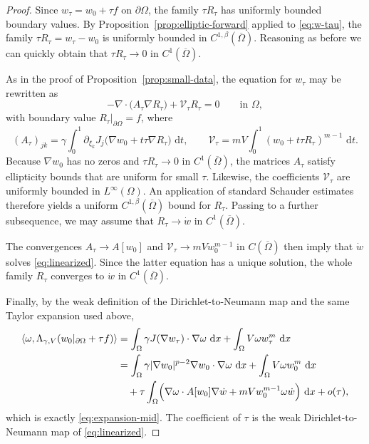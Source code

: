 \documentclass[a4paper,12pt]{article}
\newcommand{\la}{\langle}
\newcommand{\ra}{\rangle}
\newcommand{\pr}{\partial}
\newcommand{\dd}{\,\mathrm{d}}
\theoremstyle{definition}
\theoremstyle{remark}
\begin{document}
\begin{proof}
Since $w_\tau=w_0+\tau f$ on $\pr\Omega$, the family $\tau R_\tau$ has uniformly bounded boundary values. By Proposition~\ref{prop:elliptic-forward} applied to \eqref{eq:w-tau}, the family $\tau R_\tau=w_\tau-w_0$ is uniformly bounded in $C^{1,\beta}(\overline\Omega)$. Reasoning as before we can quickly obtain that $\tau R_\tau\to 0$ in $C^1(\overline\Omega)$.

As in the proof of Proposition~\ref{prop:small-data}, the equation for $w_\tau$ may be rewritten as
\[
-\nabla\cdot\bigl(A_\tau\nabla R_\tau\bigr)+\mathcal V_\tau R_\tau=0
\qquad\text{in }\Omega,
\]
with boundary value $R_\tau|_{\pr\Omega}=f$, where
\[
(A_\tau)_{jk}=\gamma\int_0^1 \partial_{\xi_k}J_j\bigl(\nabla w_0+t\tau\nabla R_\tau\bigr)\,\dd t,
\qquad
\mathcal V_\tau=mV\int_0^1 (w_0+t\tau R_\tau)^{m-1}\,\dd t.
\]
Because $\nabla w_0$ has no zeros and $\tau R_\tau\to 0$ in $C^1(\overline\Omega)$, the matrices $A_\tau$ satisfy ellipticity bounds that are uniform for small $\tau$. Likewise, the coefficients $\mathcal V_\tau$ are uniformly bounded in $L^\infty(\Omega)$. An  application of standard Schauder estimates therefore yields a uniform $C^{1,\beta}(\overline\Omega)$ bound for $R_\tau$. Passing to a further subsequence, we may assume that $R_\tau\to \dot w$ in $C^1(\overline\Omega)$.

The convergences $A_\tau\to A[w_0]$ and $\mathcal V_\tau\to mVw_0^{m-1}$ in $C(\overline\Omega)$ then imply that $\dot w$ solves \eqref{eq:linearized}. Since the latter equation has a unique solution, the whole family $R_\tau$ converges to $\dot w$ in $C^1(\overline\Omega)$.

Finally, by the weak definition of the Dirichlet-to-Neumann map and the same Taylor expansion used above,
\begin{align*}
\la \omega,\Lambda_{\gamma,V}(w_0|_{\pr\Omega}+\tau f)\ra
&=\int_\Omega \gamma J(\nabla w_\tau)\cdot\nabla\omega\,\dd x+\int_\Omega V\omega w_\tau^m\,\dd x\\
&=\int_\Omega \gamma|\nabla w_0|^{p-2}\nabla w_0\cdot\nabla\omega\,\dd x+\int_\Omega V\omega w_0^m\,\dd x\\
&\quad+\tau\int_\Omega\Bigl(\nabla\omega\cdot A[w_0]\nabla\dot w+mVw_0^{m-1}\omega\dot w\Bigr)\,\dd x+o(\tau),
\end{align*}
which is exactly \eqref{eq:expansion-mid}. The coefficient of $\tau$ is the weak Dirichlet-to-Neumann map of \eqref{eq:linearized}.
\end{proof}
\end{document}
